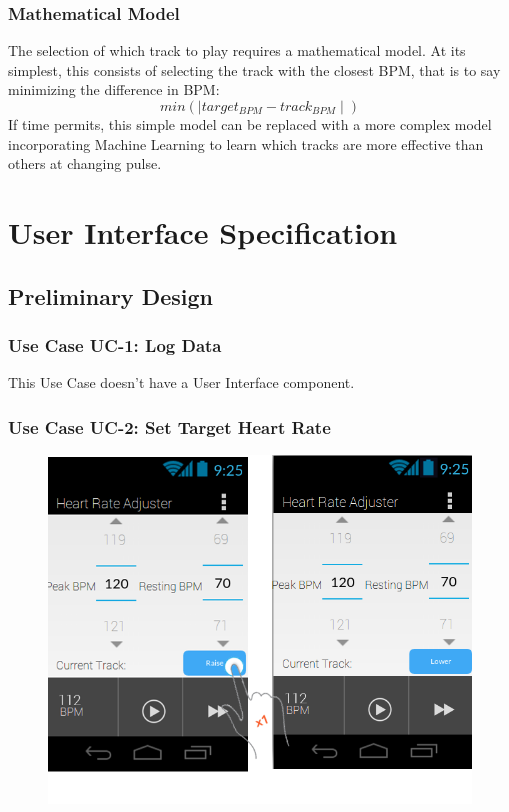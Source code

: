 \documentclass[letterpaper,english, 12pt]{scrreprt}
\begin{document}
\subsection{Mathematical Model}
The selection of which track to play requires a mathematical model. At its simplest, this consists of selecting the track with the closest BPM, that is to say minimizing the difference in BPM:
\begin{equation}
  min(\mid target_{BPM} - track_{BPM} \mid)
\end{equation}
If time permits, this simple model can be replaced with a more complex model incorporating Machine Learning to learn which tracks are more effective than others at changing pulse.

\chapter{User Interface Specification}
\section{Preliminary Design}

\subsection{Use Case UC-1: Log Data}
This Use Case doesn't have a User Interface component.

\subsection{Use Case UC-2: Set Target Heart Rate}

\begin{figure}[H]
	\centering
	\includegraphics{img/Prelim_Design/PrelimDesign_1.png}\\
\end{figure}
\end{document}
